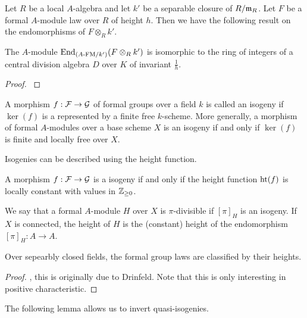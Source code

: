 Let $R$ be a local $A$-algebra and let $k'$ be a separable closure of $R/\mathfrak{m}_R$.
Let $F$ be a formal $A$-module law over $R$ of height $h$. Then we have the
following result on the endomorphisms of $F \otimes_R k'$.
\begin{lem}
  The $A$-module $\operatorname{End}_{{({A}\text-\mathrm{FM}/{k'})}}(F \otimes_R k')$ is isomorphic to the ring
  of integers of a central division algebra $D$ over $K$ of invariant $\frac 1h$.
\begin{proof}
  \cite[Proposition 1.7]{drinfel1974elliptic} 
\end{proof}
\end{lem}

\begin{defi}[Isogeny]
  A morphism $f: \mathcal{F} \to \mathcal{G}$ of formal groups over a field $k$ is called an isogeny if
  $\ker(f)$ is a represented by a finite free $k$-scheme. More generally, a
  morphism of formal $A$-modules over a base scheme $X$ is an isogeny if and
  only if $\ker(f)$ is finite and locally free over $X$. 
\end{defi}

Isogenies can be described using the height function.

\begin{lem}
  A morphism $f: \mathcal{F} \to \mathcal{G}$ is a isogeny if and only if the height 
  function $\textnormal{ht}(f)$ is locally constant with values in $\mathbb{Z}_{\geq 0}$. 
\end{lem}

\begin{defi}
  We say that a formal $A$-module $H$ over $X$ is $\pi$-divisible if 
  $[\pi]_H$ is an isogeny. If $X$ is connected, the height of $H$ is the
  (constant) height of the endomorphism $[\pi]_H: A \to A$. 
\end{defi}

\begin{lem}
  Over sepearbly closed fields, the formal group laws are classified by their 
  heights.
\begin{proof}
  \cite[Theorem 19.4.1]{hazewinkel1978formal}, this is originally due to Drinfeld.
  Note that this is only interesting in positive characteristic.
\end{proof}
\end{lem}

The following lemma allows us to invert quasi-isogenies.

